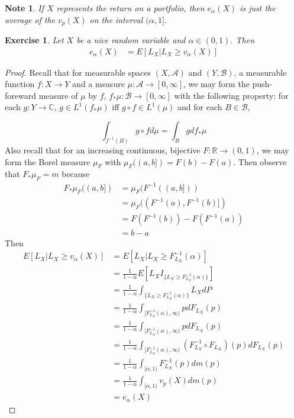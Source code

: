 \documentclass[12pt]{amsart}
\newtheorem{note}[thm]{Note}
\newtheorem{ex}[thm]{Exercise}
\newcommand{\al}{\alpha}
\newcommand{\C}{\mathbb{C}}
\newcommand{\R}{\mathbb{R}}
\newcommand{\MA}{\mathcal{A}}
\newcommand{\MB}{\mathcal{B}}
\newcommand{\RG}{[0,\infty]}
\begin{document}
\begin{note}
If $X$ represents the return on a portfolio, then $e_{\al}(X)$ is just the average of the $v_{p}(X)$ on the interval $(\al, 1]$.
\end{note}

\begin{ex}
Let $X$ be a nice random variable and $\al\in (0,1)$. Then 
\begin{align*}
e_{\al}(X) 
&= E[L_X|L_X \geq v_{\al}(X)]
\end{align*}
\end{ex}

\begin{proof}
Recall that for measurable spaces $(X,\MA)$ and $(Y, \MB)$, a measurable function $f:X \rightarrow Y$ and a measure $\mu:\MA \rightarrow \RG$, we may form the push-foreward measure of $\mu$ by $f$, $f_{*}\mu:\MB \rightarrow \RG$ with the following property: for each $g:Y \rightarrow \C$, $g \in L^1(f_* \mu)$ iff  $g \circ f \in L^1(\mu)$ and for each $B \in \MB$, 

$$\int_{f^{-1}(B)}g \circ f d\mu = \int_B g d f_*\mu$$
Also recall that for an increasing continuous, bijective $F:\R \rightarrow (0,1)$, we may form the Borel measure $\mu_F$ with $\mu_F((a,b]) = F(b)-F(a)$. Then observe that $F_*\mu_F = m$ because
\begin{align*}
{F}_{*} \mu_F ((a,b]) 
&= \mu_F(F^{-1}((a,b]))\\
&= \mu_F((F^{-1}(a), F^{-1}(b)]) \\ 
&= F(F^{-1}(b)) - F(F^{-1}(a))\\
&= b-a
\end{align*}
Then  
\begin{align*}
E[L_X |L_X \geq v_{\al}(X)]
&= E[L_X|L_X \geq F^{-1}_{L_X}(\al)] \\ 
&= \frac{1}{1-\al}E [L_X I_{\{L_X \geq F^{-1}_{L_X}(\al)\}}] \\ 
&=  \frac{1}{1-\al} \int_{\{L_X \geq F_{L_X}^{-1}(\al)\}}L_X dP \\
&= \frac{1}{1-\al} \int_{[F_{L_X}^{-1}(\al),  \infty)}pd F_{L_X}(p) \\
&= \frac{1}{1-\al} \int_{[F_{L_X}^{-1}(\al),  \infty)}pd F_{L_X}(p) \\
&= \frac{1}{1-\al} \int_{[F_{L_X}^{-1}(\al),  \infty)}(F^{-1}_{L_X} \circ F_{L_X}) (p)d F_{L_X}(p) \\
&= \frac{1}{1-\al} \int_{[\al,  1)} F^{-1}_{L_X}(p)dm(p)\\
&= \frac{1}{1-\al} \int_{[\al,  1)} v_{p}(X)dm(p) \\
&= e_{\al}(X)
\end{align*}
\end{proof}
\end{document}
